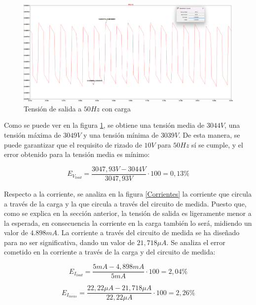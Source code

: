 \begin{figure}[H]
    \centering
    \includegraphics[width=1\textwidth]{Imagenes_alvaro/Vout_50hz_load.png}
    \caption{Tensión de salida a $50Hz$ con carga}
    \label{Vout_50hz_load}
\end{figure}

Como se puede ver en la figura \ref{Vout_50hz_load}, se obtiene una tensión media de $3044V$, una tensión máxima de $3049V$ y una tensión
mínima de $3039V$. De esta manera, se puede garantizar que el requisito de rizado de $10V$ para $50Hz$ sí se cumple, y el error obtenido 
para la tensión media es mínimo:

\begin{equation}
    E_{V_{load}} = \frac{3047,93V - 3044V}{3047,93V} \cdot 100 = 0,13\%
\end{equation}

Respecto a la corriente, se analiza en la figura \ref{Corrientes} la corriente que circula a través de la carga y la que circula a través del circuito
de medida. Puesto que, como se explica en la sección anterior, la tensión de salida es ligeramente menor a la esperada, en consecuencia la corriente en la carga también lo será,
midiendo un valor de $4.898mA$. La corriente a través del circuito de medida se ha diseñado para no ser significativa, dando un valor de $21,718\mu A$.
Se analiza el error cometido en la corriente a través de la carga y del circuito de medida:

\begin{equation}
    E_{I_{load}} = \frac{5mA - 4,898mA}{5mA} \cdot 100 = 2,04\%
\end{equation}

\begin{equation}
    E_{I_{meas}} = \frac{22,22\mu A - 21,718\mu A}{22,22\mu A} \cdot 100 = 2,26\%
\end{equation}

